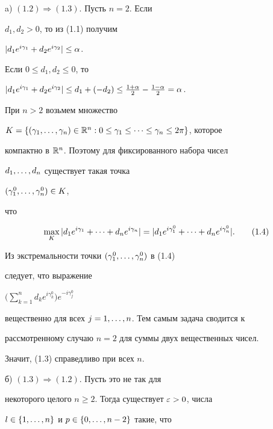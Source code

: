 \begin{pf}


a) $(1.2)\Longrightarrow(1.3)$. Пусть $n=2$. Если


$d_1,d_2>0$, то из (1.1) получим


$|d_1e^{i\gamma_1}+d_2e^{i\gamma_2}|\le \alpha$.


Если $0\le d_1, d_2\le 0$, то


$|d_1e^{i\gamma_1}+d_2e^{i\gamma_2}|\le d_1+(-d_2)\le


\frac{1+\al}{2}-\frac{1-\al}{2}=\al$.





При $n> 2$ возьмем множество


$K=\{(\gamma_1,\ld,\gamma_n)\in\Rn:


0\le\gamma_1\le\cd\le\gamma_n\le 2\pi\}$, которое


компактно в ${\Bbb R}^n$. Поэтому для фиксированного набора чисел


$d_1,\dotsc,d_n$ существует такая точка


$(\gamma^0_1,\dotsc,\gamma^0_n)\in K$,


что


\begin{equation}


\max_K |d_1e^{i\gamma_1}+\cd+d_ne^{i\gamma_n}|=


|d_1e^{i\gamma^0_1}+\cd+d_ne^{i\gamma^0_n}|. \tag{1.4}


\end{equation}





Из экстремальности точки $(\gamma^0_1,\dotsc,\gamma^0_n)$ в (1.4)


следует, что выражение


$\Big(\sum\limits_{k=1}^nd_ke^{i\gamma^0_k}\Big)e^{-i\gamma^0_j}$


вещественно для всех $j=1,\dotsc,n$. Тем самым задача сводится к


рассмотренному случаю $n=2$ для суммы двух вещественных чисел.


Значит, (1.3) справедливо при всех $n$.





б) $(1.3)\Longrightarrow(1.2)$. Пусть это не так для


некоторого целого $n\ge 2$. Тогда существует $\varepsilon>0$, числа


$l\in\{1,\dotsc,n\}$ и $p\in\{0,\dotsc,n-2\}$ такие, что



\end{pf}
